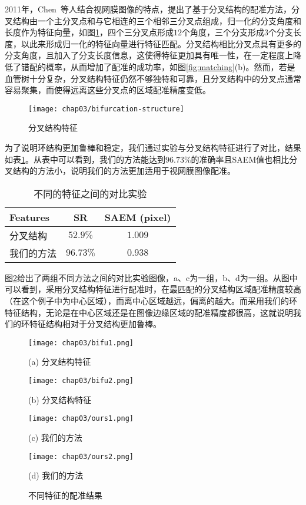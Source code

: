 2011年，Chen~\cite{chen2011retinal,chen2015retinal}等人结合视网膜图像的特点，提出了基于分叉结构的配准方法，分叉结构由一个主分叉点和与它相连的三个相邻三分叉点组成，归一化的分支角度和长度作为特征向量，如图\ref{fig:bifurcation structure}，四个三分叉点形成$12$个角度，三个分支形成$3$个分支长度，以此来形成归一化的特征向量进行特征匹配。分叉结构相比分叉点具有更多的分支角度，且加入了分支长度信息，这使得特征更加具有唯一性，在一定程度上降低了错配的概率，从而增加了配准的成功率，如图\ref{fig:matching}(b)。然而，若是血管树十分复杂，分叉结构特征仍然不够独特和可靠，且分叉结构中的分叉点通常容易聚集，而使得远离这些分叉点的区域配准精度变低。

\begin{figure}
  \centering
  \texttt{[image: chap03/bifurcation-structure]}
  \caption{分叉结构特征}
  \label{fig:bifurcation structure}
\end{figure}

为了说明环结构更加鲁棒和稳定，我们通过实验与分叉结构特征进行了对比，结果如表\ref{tab:methods}。从表中可以看到，我们的方法能达到$96.73\%$的准确率且SAEM值也相比分叉结构的方法小，说明我们的方法更加适用于视网膜图像配准。

\begin{table}
\caption{不同的特征之间的对比实验}
\centering
\begin{tabular}{lcc}
\toprule
Features & SR & SAEM (pixel)\\
\midrule
分叉结构 & $52.9\%$ & $1.009$\\
我们的方法 & $\mathbf{96.73\%}$ & $\mathbf{0.938}$\\
\bottomrule
\end{tabular}
\label{tab:methods}
\end{table}
图\ref{fig:methods-fig}给出了两组不同方法之间的对比实验图像，a、c为一组，b、d为一组。从图中可以看到，采用分叉结构特征进行配准时，在最匹配的分叉结构区域配准精度较高（在这个例子中为中心区域），而离中心区域越远，偏离的越大。而采用我们的环特征结构，无论是在中心区域还是在图像边缘区域的配准精度都很高，这就说明我们的环特征结构相对于分叉结构更加鲁棒。
\begin{figure}[H]
\centering
\begin{minipage}[b]{0.48\textwidth} 
      \centering 
      \texttt{[image: chap03/bifu1.png]}
        \centerline{(a) 分叉结构特征}\medskip
\end{minipage}
  \begin{minipage}[b]{0.48\textwidth}
    \centering
    \texttt{[image: chap03/bifu2.png]}
      \centerline{(b) 分叉结构特征}\medskip
  \end{minipage}
\begin{minipage}[b]{0.48\textwidth}
	\centering
      \texttt{[image: chap03/ours1.png]}
        \centerline{(c) 我们的方法}\medskip
    \end{minipage}
  \begin{minipage}[b]{0.48\textwidth}
    \centering
    \texttt{[image: chap03/ours2.png]}
      \centerline{(d) 我们的方法}\medskip
  \end{minipage}
\caption{不同特征的配准结果}
\label{fig:methods-fig}
\end{figure}

